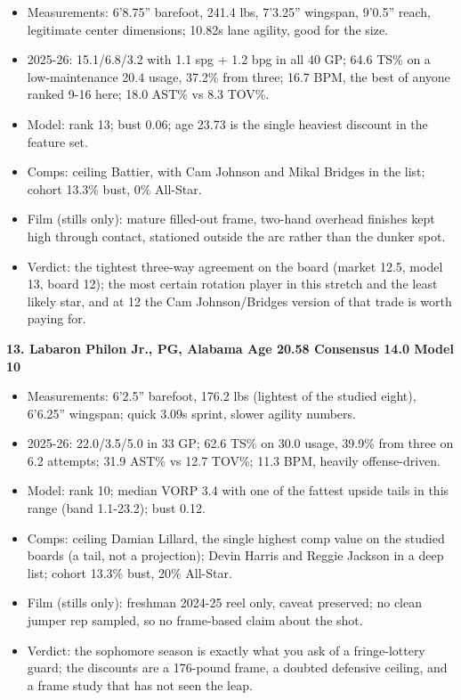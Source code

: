 \documentclass[
  10pt,
]{article}
\providecommand{\tightlist}{%
  \setlength{\itemsep}{0pt}\setlength{\parskip}{0pt}}
\begin{document}
\begin{itemize}
\tightlist
\item
  Measurements: 6'8.75'' barefoot, 241.4 lbs, 7'3.25'' wingspan, 9'0.5'' reach,
  legitimate center dimensions; 10.82s lane agility, good for the size.
\item
  2025-26: 15.1/6.8/3.2 with 1.1 spg + 1.2 bpg in all 40 GP; 64.6 TS\% on a
  low-maintenance 20.4 usage, 37.2\% from three; 16.7 BPM, the best of anyone
  ranked 9-16 here; 18.0 AST\% vs 8.3 TOV\%.
\item
  Model: rank 13; bust 0.06; age 23.73 is the single heaviest discount in the
  feature set.
\item
  Comps: ceiling Battier, with Cam Johnson and Mikal Bridges in the list; cohort
  13.3\% bust, 0\% All-Star.
\item
  Film (stills only): mature filled-out frame, two-hand overhead finishes kept
  high through contact, stationed outside the arc rather than the dunker spot.
\item
  Verdict: the tightest three-way agreement on the board (market 12.5, model 13,
  board 12); the most certain rotation player in this stretch and the least
  likely star, and at 12 the Cam Johnson/Bridges version of that trade is worth
  paying for.
\end{itemize}

\textbf{13. Labaron Philon Jr., PG, Alabama \textbar{} Age 20.58 \textbar{}
Consensus 14.0 \textbar{} Model 10}

\begin{itemize}
\tightlist
\item
  Measurements: 6'2.5'' barefoot, 176.2 lbs (lightest of the studied eight),
  6'6.25'' wingspan; quick 3.09s sprint, slower agility numbers.
\item
  2025-26: 22.0/3.5/5.0 in 33 GP; 62.6 TS\% on 30.0 usage, 39.9\% from three on
  6.2 attempts; 31.9 AST\% vs 12.7 TOV\%; 11.3 BPM, heavily offense-driven.
\item
  Model: rank 10; median VORP 3.4 with one of the fattest upside tails in this
  range (band 1.1-23.2); bust 0.12.
\item
  Comps: ceiling Damian Lillard, the single highest comp value on the studied
  boards (a tail, not a projection); Devin Harris and Reggie Jackson in a deep
  list; cohort 13.3\% bust, 20\% All-Star.
\item
  Film (stills only): freshman 2024-25 reel only, caveat preserved; no clean
  jumper rep sampled, so no frame-based claim about the shot.
\item
  Verdict: the sophomore season is exactly what you ask of a fringe-lottery
  guard; the discounts are a 176-pound frame, a doubted defensive ceiling, and a
  frame study that has not seen the leap.
\end{itemize}
\end{document}
